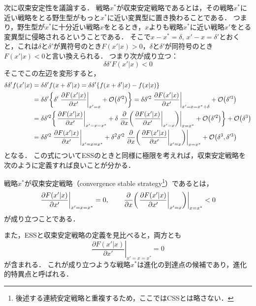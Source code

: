 次に収束安定性を議論する．
戦略$x^*$が収束安定戦略であるとは，その戦略$x^*$に近い戦略をとる野生型がもっと$x^*$に近い変異型に置き換わることである．
つまり，野生型が$x^*$に十分近い戦略$x$をとるとき，$x$よりも戦略$x^*$に近い戦略$x'$をとる変異型に侵略されるということである．
そこで$x-x^*=\delta,\, x'-x=\delta'$とおくと，これは$\delta$と$\delta'$が異符号のとき$F(x'|x)>0$，$\delta$と$\delta'$が同符号のとき$F(x'|x)<0$と言い換えられる．
つまり次が成り立つ：
\begin{equation}
  \delta \delta' F(x'|x) < 0
\end{equation}
そこでこの左辺を変形すると，
\begin{align}
  \delta \delta' f(x'|x) &= \delta \delta' f(x + \delta'|x) = \delta \delta' \qty{f(x+\delta'|x) - f(x|x)}\notag\\ 
  &= \delta \delta' \qty{\delta'\left.\frac{\partial F(x'|x)}{\partial x'}\right|_{x'=x} + \order{\delta'^2}} = \delta \delta'^2 \left.\frac{\partial F(x'|x)}{\partial x'}\right|_{x'=x=x^*+\delta} + \order{\delta'^3} \notag\\
  &= \delta \delta'^2 \qty{\left.\frac{\partial F(x'|x)}{\partial x'}\right|_{x'=x=x^*} + \delta \left.\frac{\partial}{\partial x}\qty(\left.\frac{\partial F(x'|x)}{\partial x'}\right|_{x'=x}) \right|_{x=x^*}+\order{\delta'^2}} + \order{\delta^3} \notag \\
  &= \delta\delta'^2 \left.\frac{\partial F(x'|x)}{\partial x'}\right|_{x'=x=x^*} + \delta^2\delta'^2 \left.\frac{\partial}{\partial x}\qty(\left.\frac{\partial F(x'|x)}{\partial x'}\right|_{x'=x}) \right|_{x=x^*} + \order{\delta^3, \delta'^3}
\end{align}
となる．
この式についてESSのときと同様に極限を考えれば，収束安定戦略を次のように定義すれば良いことが分かる．
\begin{dfn}[収束安定戦略]
  戦略$x^*$が収束安定戦略（convergence stable strategy\footnote{後述する連続安定戦略と重複するため，ここではCSSとは略さない．}）であるとは，
  \begin{equation}
    \left.\frac{\partial F(x'|x)}{\partial x'}\right|_{x'=x=x^*} = 0 ,\qquad
    \left.\frac{\partial}{\partial x}\qty(\left.\frac{\partial F(x'|x)}{\partial x'}\right|_{x'=x}) \right|_{x=x^*} < 0
  \end{equation}
  が成り立つことである．
\end{dfn}

また，ESSと収束安定戦略の定義を見比べると，両方とも
\begin{equation}
  \left.\frac{\partial F(x'|x)}{\partial x'}\right|_{x'=x=x^*} = 0
\end{equation}
が含まれる．
これが成り立つような戦略$x^*$は進化の到達点の候補であり，進化的特異点と呼ばれる．

